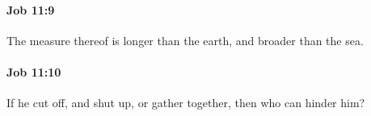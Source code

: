 		\paragraph{Job 11:9} %
			\label{JOB-11-9}

			The measure thereof is longer than the earth, and broader than the sea.


		\paragraph{Job 11:10} %
			\label{JOB-11-10}

			If he cut off, and shut up, or gather together, then who can hinder him?


